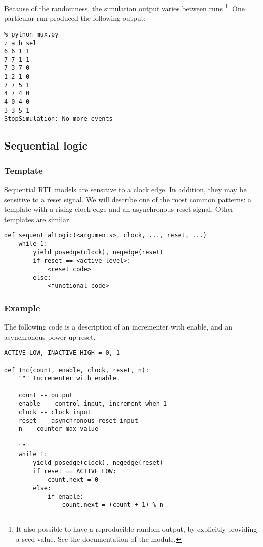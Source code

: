 Because of the randomness, the simulation output varies between runs
\footnote{It also possible to have a reproducible random output, by
explicitly providing a seed value. See the documentation of the
 module.}. One particular run produced the following
output:

\begin{verbatim}
% python mux.py
z a b sel
6 6 1 1
7 7 1 1
7 3 7 0
1 2 1 0
7 7 5 1
4 7 4 0
4 0 4 0
3 3 5 1
StopSimulation: No more events
\end{verbatim}


\subsection{Sequential logic \label{model-seq}}

\subsubsection{Template \label{model-seq-templ}}
Sequential RTL models are sensitive to a clock edge. In addition, they
may be sensitive to a reset signal. We will describe one of the most
common patterns: a template with a rising clock edge and an
asynchronous reset signal. Other templates are similar.

\begin{verbatim}
def sequentialLogic(<arguments>, clock, ..., reset, ...)
    while 1:
        yield posedge(clock), negedge(reset)
        if reset == <active level>:
            <reset code>
        else:
            <functional code>
\end{verbatim}


\subsubsection{Example \label{model-seq-ex}}
The following code is a description of an incrementer with enable, and
an asynchronous power-up reset.

\begin{verbatim}
ACTIVE_LOW, INACTIVE_HIGH = 0, 1

def Inc(count, enable, clock, reset, n):
    """ Incrementer with enable.
    
    count -- output
    enable -- control input, increment when 1
    clock -- clock input
    reset -- asynchronous reset input
    n -- counter max value

    """
    while 1:
        yield posedge(clock), negedge(reset)
        if reset == ACTIVE_LOW:
            count.next = 0
        else:
            if enable:
                count.next = (count + 1) % n
\end{verbatim}

